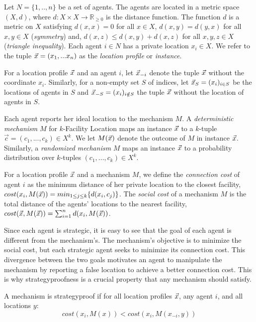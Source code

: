 \begin{definition}
Let $N= \{1,..,n\}$ be a set of agents. The agents are located in a metric space $(X,d)$, where $d:X \times X \rightarrow  \mathbb R_{\ge 0} $ is the distance function. The function $d$ is a metric on $X$ satisfying $d(x,x)=0$ for all $x\in X$, $d(x,y)=d(y,x)$ for all $x,y\in X$ (\emph{symmetry}) and, $d(x,z)\le d(x,y)+d(x,z)$ for all $x,y,z\in X$ (\emph{triangle inequality}). Each agent $i\in N$ has a private location $x_i \in X$. We refer to the tuple $\vec{x}=(x_1,...x_n)$ as the \emph{location profile} or \emph{instance}.
\end{definition}


For a location profile $\vec{x}$ and an agent $i$, let $\vec{x}_{-i}$ denote the tuple $\vec{x}$ without the coordinate $x_i$. Similarly, for a non-empty set $S$ of indices, let $\vec{x}_S=(x_i)_{i\in S}$ be the locations of agents in $S$ and $\vec{x}_{-S}=(x_i)_{i\notin S}$ the tuple $\vec{x}$ without the location of agents in $S$.  

Each agent reports her ideal location to the mechanism $M$. A \emph{deterministic mechanism} $M$ for $k$-Facility Location maps an instance $\vec{x}$  to a $k$-tuple $\vec{c}=(c_1,...,c_k)\in X^k$. We let $M(\vec{x})$ denote the outcome of $M$ in instance $\vec{x}$. Similarly, a \emph{randomized mechanism} $M$ maps an instance $\vec{x}$ to a probability distribution over $k$-tuples $(c_1,...,c_k)\in X^k$.

For a location profile $\vec{x}$ and a mechanism $M$, we define the \emph{connection cost} of agent $i$ as the minimum distance of her private location to the closest facility, $cost(x_i,M(\vec{x})) = min_{1\le j \le k} \{d(x_i,c_j) \}$. The \emph{social cost} of a mechanism $M$ is the total distance of the agents' locations to the nearest facility, $cost(\vec{x},M(\vec{x})) = \sum_{i=1}^n d(x_i,M(\vec{x}))$. 

Since each agent is strategic, it is easy to see that the goal of each agent is different from the mechanism's. The mechanism's objective is to minimize the social cost, but each strategic agent seeks to minimize its connection cost. This divergence between the two goals motivates an agent to manipulate the mechanism by reporting a false location to achieve a better connection cost. This is why strategyproofness is a crucial property that any mechanism should satisfy.

\begin{definition}[Strategyproof]
A mechanism is strategyproof if for all location profiles $\vec{x}$, any agent $i$, and all locations $y$: 
\[cost(x_i,M(x)) < cost(x_i, M(x_{-i},y))\]
\end{definition}

